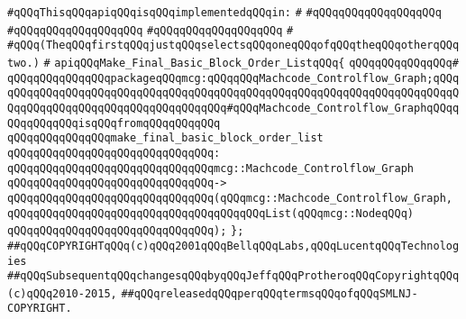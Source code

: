 \verb|#qQQqThisqQQqapiqQQqisqQQqimplementedqQQqin:|\newline
\verb|#|\newline
\verb|#qQQqqQQqqQQqqQQqqQQq|\newline
\verb|#qQQqqQQqqQQqqQQqqQQq|\newline
\verb|#qQQqqQQqqQQqqQQqqQQq|\newline
\verb|#|\newline
\verb|#qQQq(TheqQQqfirstqQQqjustqQQqselectsqQQqoneqQQqofqQQqtheqQQqotherqQQqtwo.)|\newline
\verb|#|\newline
\verb|apiqQQqMake_Final_Basic_Block_Order_ListqQQq{|\newline
\verb|qQQqqQQqqQQqqQQq#|\newline
\verb|qQQqqQQqqQQqqQQqpackageqQQqmcg:qQQqqQQqMachcode_Controlflow_Graph;qQQqqQQqqQQqqQQqqQQqqQQqqQQqqQQqqQQqqQQqqQQqqQQqqQQqqQQqqQQqqQQqqQQqqQQqqQQqqQQqqQQqqQQqqQQqqQQqqQQqqQQqqQQq#qQQqMachcode_Controlflow_GraphqQQqqQQqqQQqqQQqisqQQqfromqQQqqQQqqQQq|\newline
\newline
\verb|qQQqqQQqqQQqqQQqmake_final_basic_block_order_list|\newline
\verb|qQQqqQQqqQQqqQQqqQQqqQQqqQQqqQQq:|\newline
\verb|qQQqqQQqqQQqqQQqqQQqqQQqqQQqqQQqmcg::Machcode_Controlflow_Graph|\newline
\verb|qQQqqQQqqQQqqQQqqQQqqQQqqQQqqQQq->|\newline
\verb|qQQqqQQqqQQqqQQqqQQqqQQqqQQqqQQq(qQQqmcg::Machcode_Controlflow_Graph,|\newline
\verb|qQQqqQQqqQQqqQQqqQQqqQQqqQQqqQQqqQQqqQQqList(qQQqmcg::NodeqQQq)|\newline
\verb|qQQqqQQqqQQqqQQqqQQqqQQqqQQqqQQq);|\newline
\newline
\verb|};|\newline
\newline
\newline
\verb|##qQQqCOPYRIGHTqQQq(c)qQQq2001qQQqBellqQQqLabs,qQQqLucentqQQqTechnologies|\newline
\verb|##qQQqSubsequentqQQqchangesqQQqbyqQQqJeffqQQqProtheroqQQqCopyrightqQQq(c)qQQq2010-2015,|\newline
\verb|##qQQqreleasedqQQqperqQQqtermsqQQqofqQQqSMLNJ-COPYRIGHT.|\newline

